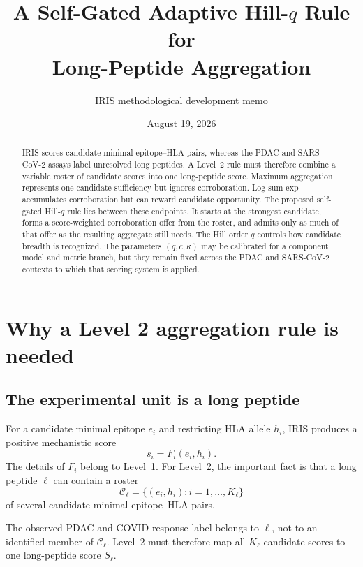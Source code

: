 \documentclass[11pt]{article}
\title{\textbf{A Self-Gated Adaptive Hill-$q$ Rule for\\Long-Peptide Aggregation}}
\author{IRIS methodological development memo}
\date{August 19, 2026}
\begin{document}
\maketitle

\begin{abstract}
IRIS scores candidate minimal-epitope--HLA pairs, whereas the PDAC and
SARS-CoV-2 assays label unresolved long peptides. A Level~2 rule must therefore
combine a variable roster of candidate scores into one long-peptide score.
Maximum aggregation represents one-candidate sufficiency but ignores
corroboration. Log-sum-exp accumulates corroboration but can reward candidate
opportunity. The proposed self-gated Hill-$q$ rule lies between these
endpoints. It starts at the strongest candidate, forms a score-weighted
corroboration offer from the roster, and admits only as much of that offer as
the resulting aggregate still needs. The Hill order $q$ controls how candidate
breadth is recognized. The parameters $(q,c,\kappa)$ may be calibrated for a
component model and metric branch, but they remain fixed across the PDAC and
SARS-CoV-2 contexts to which that scoring system is applied.
\end{abstract}

\section{Why a Level 2 aggregation rule is needed}

\subsection{The experimental unit is a long peptide}

For a candidate minimal epitope $e_i$ and restricting HLA allele $h_i$, IRIS
produces a positive mechanistic score
\begin{equation}
s_i=F_i(e_i,h_i).
\end{equation}
The details of $F_i$ belong to Level~1. For Level~2, the important fact is
that a long peptide $\ell$ can contain a roster
\begin{equation}
\mathcal C_\ell=\{(e_i,h_i):i=1,\ldots,K_\ell\}
\end{equation}
of several candidate minimal-epitope--HLA pairs.

The observed PDAC and COVID response label belongs to $\ell$, not to an
identified member of $\mathcal C_\ell$. Level~2 must therefore map all
$K_\ell$ candidate scores to one long-peptide score $S_\ell$.
\end{document}
